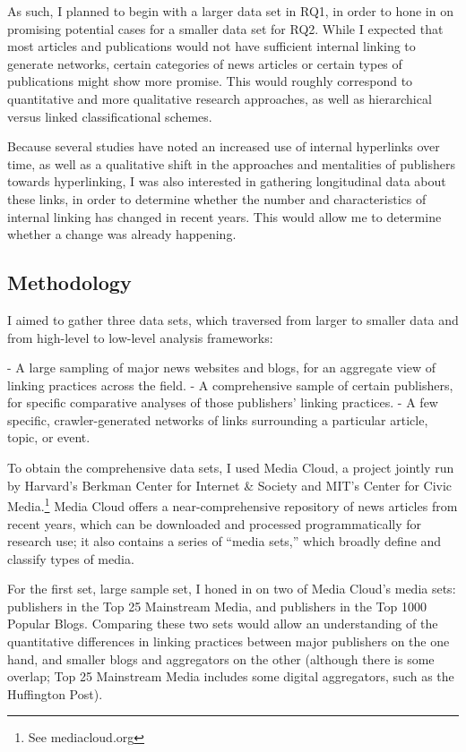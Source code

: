 As such, I planned to begin with a larger data set in RQ1, in order to hone in on promising potential cases for a smaller data set for RQ2. While I expected that most articles and publications would not have sufficient internal linking to generate networks, certain categories of news articles or certain types of publications might show more promise. This would roughly correspond to quantitative and more qualitative research approaches, as well as hierarchical versus linked classificational schemes.

Because several studies have noted an increased use of internal hyperlinks over time, as well as a qualitative shift in the approaches and mentalities of publishers towards hyperlinking, I was also interested in gathering longitudinal data about these links, in order to determine whether the number and characteristics of internal linking has changed in recent years. This would allow me to determine whether a change was already happening.

\subsection{Methodology}

I aimed to gather three data sets, which traversed from larger to smaller data and from high-level to low-level analysis frameworks:

- A large sampling of major news websites and blogs, for an aggregate view of linking practices across the field.
- A comprehensive sample of certain publishers, for specific comparative analyses of those publishers' linking practices.
- A few specific, crawler-generated networks of links surrounding a particular article, topic, or event.

To obtain the comprehensive data sets, I used Media Cloud, a project jointly run by Harvard's Berkman Center for Internet \& Society and MIT's Center for Civic Media.\footnote{See mediacloud.org} Media Cloud offers a near-comprehensive repository of news articles from recent years, which can be downloaded and processed programmatically for research use; it also contains a series of ``media sets,'' which broadly define and classify types of media.

For the first set, large sample set, I honed in on two of Media Cloud's media sets: publishers in the Top 25 Mainstream Media, and publishers in the Top 1000 Popular Blogs. Comparing these two sets would allow an understanding of the quantitative differences in linking practices between major publishers on the one hand, and smaller blogs and aggregators on the other (although there is some overlap; Top 25 Mainstream Media includes some digital aggregators, such as the Huffington Post).

